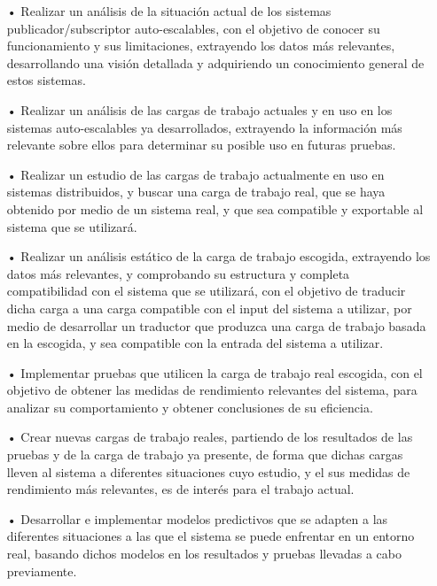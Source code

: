 \begin{itemize}

    \item[•] Realizar un análisis de la situación actual de los sistemas publicador/subscriptor 
    auto-escalables, con el objetivo de conocer su funcionamiento y sus limitaciones, extrayendo 
    los datos más relevantes, desarrollando una visión detallada y adquiriendo un conocimiento
    general de estos sistemas.
    
    \item[•] Realizar un análisis de las cargas de trabajo actuales y en uso en los sistemas 
    auto-escalables ya desarrollados, extrayendo la información más relevante sobre ellos para
    determinar su posible uso en futuras pruebas.
    
    \item[•] Realizar un estudio de las cargas de trabajo actualmente en uso en sistemas 
    distribuidos, y buscar una carga de trabajo real, que se haya obtenido por medio de un 
    sistema real, y que sea compatible y exportable al sistema que se utilizará.
    
    \item[•] Realizar un análisis estático de la carga de trabajo escogida, extrayendo los datos más 
    relevantes, y comprobando su estructura y completa compatibilidad con el sistema que se utilizará,
    con el objetivo de traducir dicha carga a una carga compatible con el input del sistema a 
    utilizar, por medio de desarrollar un traductor que produzca una carga de trabajo basada en la 
    escogida, y sea compatible con la entrada del sistema a utilizar.
    
    \item[•] Implementar pruebas que utilicen la carga de trabajo real escogida, con el objetivo de
    obtener las medidas de rendimiento relevantes del sistema, para analizar su comportamiento y 
    obtener conclusiones de su eficiencia.

    \item[•] Crear nuevas cargas de trabajo reales, partiendo de los resultados de las pruebas y
    de la carga de trabajo ya presente, de forma que dichas cargas lleven al sistema a diferentes 
    situaciones cuyo estudio, y el sus medidas de rendimiento más relevantes, es de interés para el 
    trabajo actual.

    \item[•] Desarrollar e implementar modelos predictivos que se adapten a las diferentes
    situaciones a las que el sistema se puede enfrentar en un entorno real, basando dichos modelos en
    los resultados y pruebas llevadas a cabo previamente.

\end{itemize}

